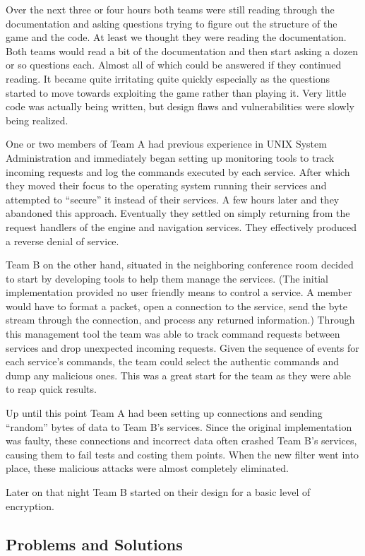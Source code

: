 \documentclass[10pt]{article}
\begin{document}
Over the next three or four hours both teams were still reading through the
documentation and asking questions trying to figure out the structure of the
game and the code. At least we thought they were reading the documentation.
Both teams would read a bit of the documentation and then start asking a
dozen or so questions each. Almost all of which could be answered if they
continued reading. It became quite irritating quite quickly especially as
the questions started to move towards exploiting the game rather than
playing it. Very little code was actually being written, but design flaws and
vulnerabilities were slowly being realized.

One or two members of Team A had previous experience in UNIX System
Administration and immediately began setting up monitoring tools to track
incoming requests and log the commands executed by each service. After which
they moved their focus to the operating system running their services and
attempted to ``secure'' it instead of their services. A few hours later and they
abandoned this approach. Eventually they settled on simply returning from the
request handlers of the engine and navigation services. They effectively
produced a reverse denial of service.

Team B on the other hand, situated in the neighboring conference room decided to
start by developing tools to help them manage the services. (The initial
implementation provided no user friendly means to control a service. A member
would have to format a packet, open a connection to the service, send the
byte stream through the connection, and process any returned information.)
Through this management tool the team was able to track command requests between
services and drop unexpected incoming requests. Given the sequence of events for
each service's commands, the team could select the authentic commands and dump
any malicious ones. This was a great start for the team as they were able to
reap quick results.

Up until this point Team A had been setting up connections and sending ``random''
bytes of data to Team B's services. Since the original implementation was
faulty, these connections and incorrect data often crashed Team B's services,
causing them to fail tests and costing them points. When the new filter went
into place, these malicious attacks were almost completely eliminated.

Later on that night Team B started on their design for a basic level of
encryption. 

\subsection{Problems and Solutions}
\end{document}

